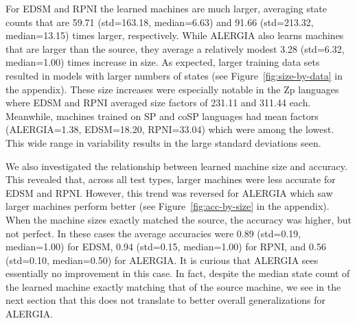 \documentclass[twoside,11pt]{article}
\newcommand{\tbf}[1]{\textbf{#1}}
\begin{document}

For EDSM and RPNI the learned machines are much larger, averaging state counts that are 59.71 (std=163.18, median=6.63) and 91.66 (std=213.32, median=13.15) times larger, respectively. While ALERGIA also learns machines that are larger than the source, they average a relatively modest 3.28 (std=6.32, median=1.00) times increase in size.
As expected, larger training data sets resulted in models with larger numbers of states  (see Figure~\ref{fig:size-by-data} in the appendix).
These size increases were especially notable in the Zp languages where EDSM and RPNI averaged size factors of 231.11 and 311.44 each. Meanwhile, machines trained on SP and coSP languages had mean factors (ALERGIA=1.38, EDSM=18.20, RPNI=33.04) which were among the lowest. This wide range in variability results in the large standard deviations seen.

We also investigated the relationship between learned machine size and accuracy. This revealed that, across all test types, larger machines were less accurate for EDSM and RPNI. However, this trend was reversed for ALERGIA which saw larger machines perform better (see Figure~\ref{fig:acc-by-size} in the appendix). 
When the machine sizes exactly matched the source, the accuracy was higher, but not perfect. In these cases the average accuracies were 0.89 (std=0.19, median=1.00) for EDSM, 0.94 (std=0.15, median=1.00) for RPNI, and 0.56 (std=0.10, median=0.50) for ALERGIA. It is curious that ALERGIA sees essentially no improvement in this case. In fact, despite the median state count of the learned machine exactly matching that of the source machine, we see in the next section that this does not translate to better overall generalizations for ALERGIA.

\end{document}

